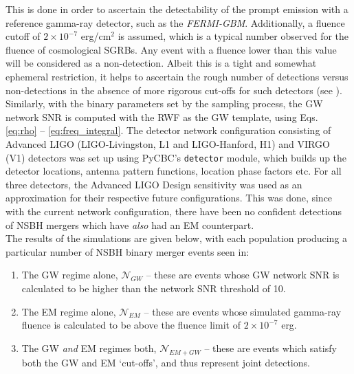     This is done in order to ascertain the detectability of the prompt emission with a
    reference gamma-ray detector, such as the \textit{FERMI-GBM}. Additionally, a
    fluence cutoff of $2 \times 10^{-7}$ erg/cm$^2$ is assumed, which is a typical
    number observed for the fluence of cosmological SGRBs. Any event with a fluence
    lower than this value will be considered as a non-detection. Albeit this is a tight
    and somewhat ephemeral restriction, it helps to ascertain the rough number of
    detections versus non-detections in the absence of more rigorous cut-offs for such
    detectors (see \cite{bhat_2016}).\\
    Similarly, with the binary parameters set by the sampling process, the GW network
    SNR is computed with the RWF as the GW template, using Eqs. \ref{eq:rho} --
    \ref{eq:freq_integral}. The detector network configuration consisting of Advanced
    LIGO (LIGO-Livingston, L1 and LIGO-Hanford, H1) and VIRGO (V1) detectors was set up
    using PyCBC's \texttt{detector} module, which builds up the detector locations,
    antenna pattern functions, location phase factors etc. For all three detectors, the
    Advanced LIGO Design sensitivity was used as an approximation for their respective
    future configurations. This was done, since with the current network configuration,
    there have been no confident detections of NSBH mergers which have \textit{also} had
    an EM counterpart.\\
    The results of the simulations are given below, with each population producing a
    particular number of NSBH binary merger events seen in:

    \begin{enumerate}

        \item The GW regime alone, $\boxed{\mathcal{N}_{GW}}$ -- these are events whose
            GW network SNR is calculated to be higher than the network SNR threshold of
            10.

        \item The EM regime alone, $\boxed{\mathcal{N}_{EM}}$ -- these are events whose
            simulated gamma-ray fluence is calculated to be above the fluence
            limit of $2 \times 10^{-7}$ erg.

        \item The GW \textit{and} EM regimes both, $\boxed{\mathcal{N}_{EM+GW}}$ --
            these are events which satisfy both the GW and EM `cut-offs', and thus
            represent joint detections.

    \end{enumerate}

